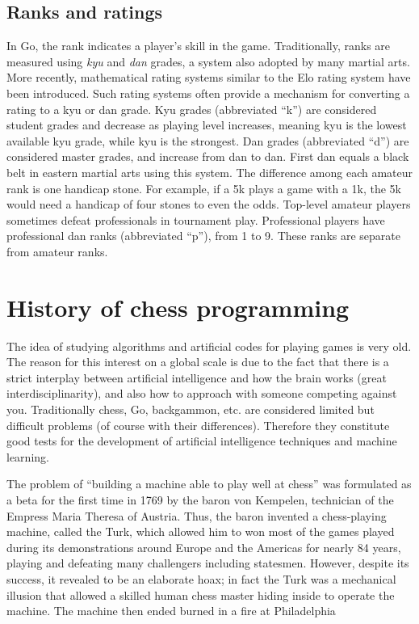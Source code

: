\subsection{Ranks and ratings}
In Go, the rank indicates a player's skill in the game. Traditionally, ranks are measured using \emph{kyu} and \emph{dan} grades, a system also adopted by many martial arts. More recently, mathematical rating systems similar to the Elo rating system have been introduced. Such rating systems often provide a mechanism for converting a rating to a kyu or dan grade. Kyu grades (abbreviated ``k'') are considered student grades and decrease as playing level increases, meaning  kyu is the lowest available kyu grade, while  kyu is the strongest. Dan grades (abbreviated ``d'') are considered master grades, and increase from  dan to  dan. First dan equals a black belt in eastern martial arts using this system.
The difference among each amateur rank is one handicap stone. For example, if a 5k plays a game with a 1k, the 5k would need a handicap of four stones to even the odds. Top-level amateur players sometimes defeat professionals in tournament play.
Professional players have professional dan ranks (abbreviated ``p''), from 1 to 9. These ranks are separate from amateur ranks.
\section{History of chess programming}
The idea of studying algorithms and artificial codes for playing games is very old. The reason for this interest on a global scale is due to the fact that there is a strict interplay between artificial intelligence and how the brain works (great interdisciplinarity), and also how to approach with someone competing against you. Traditionally chess, Go, backgammon, etc. are considered limited but difficult problems (of course with their differences). Therefore they constitute good tests for the development of artificial intelligence techniques and machine learning.

The problem of ``building a machine able to play well at chess'' was formulated as a beta for the first time in 1769 by the baron von Kempelen, technician of the Empress Maria Theresa of Austria. Thus, the baron invented a chess-playing machine, called the Turk, which allowed him to won most of the games played during its demonstrations around Europe and the Americas for nearly 84 years, playing and defeating many challengers including statesmen. However, despite its success, it revealed to be an elaborate hoax; in fact the Turk was a mechanical illusion that allowed a skilled human chess master hiding inside to operate the machine. The machine then ended burned in a fire at Philadelphia

